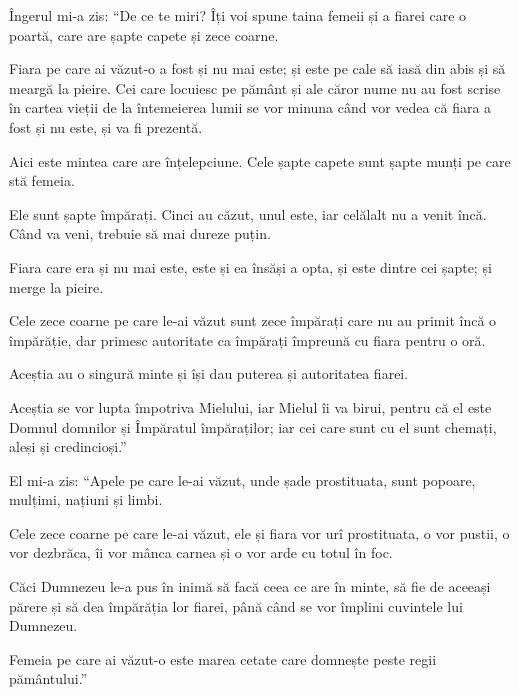 {\par }{\PP {}Îngerul mi-a zis: “De ce te miri? Îți voi spune taina femeii și a fiarei care o poartă, care are șapte capete și zece coarne.

Fiara pe care ai văzut-o a fost și nu mai este; și este pe cale să iasă din abis și să meargă la pieire. Cei care locuiesc pe pământ și ale căror nume nu au fost scrise în cartea vieții de la întemeierea lumii se vor minuna când vor vedea că fiara a fost și nu este, și va fi prezentă.


\par }{\PP {}Aici este mintea care are înțelepciune. Cele șapte capete sunt șapte munți pe care stă femeia.

Ele sunt șapte împărați. Cinci au căzut, unul este, iar celălalt nu a venit încă. Când va veni, trebuie să mai dureze puțin.

Fiara care era și nu mai este, este și ea însăși a opta, și este dintre cei șapte; și merge la pieire.

Cele zece coarne pe care le-ai văzut sunt zece împărați care nu au primit încă o împărăție, dar primesc autoritate ca împărați împreună cu fiara pentru o oră.

Aceștia au o singură minte și își dau puterea și autoritatea fiarei.

Aceștia se vor lupta împotriva Mielului, iar Mielul îi va birui, pentru că el este Domnul domnilor și Împăratul împăraților; iar cei care sunt cu el sunt chemați, aleși și credincioși.”

El mi-a zis: “Apele pe care le-ai văzut, unde șade prostituata, sunt popoare, mulțimi, națiuni și limbi.

Cele zece coarne pe care le-ai văzut, ele și fiara vor urî prostituata, o vor pustii, o vor dezbrăca, îi vor mânca carnea și o vor arde cu totul în foc.

Căci Dumnezeu le-a pus în inimă să facă ceea ce are în minte, să fie de aceeași părere și să dea împărăția lor fiarei, până când se vor împlini cuvintele lui Dumnezeu.

Femeia pe care ai văzut-o este marea cetate care domnește peste regii pământului.”



\par }
